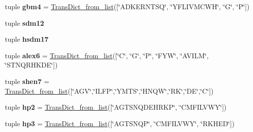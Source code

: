 \begin{DoxyCompactItemize}
\item 
\hypertarget{namespacefeat__extract_1_1_a_alphabets_a840c18714949805c6fa9387a45677e79}{}tuple {\bfseries gbm4} = \hyperlink{namespacefeat__extract_1_1_a_alphabets_acdda8523b57175e0e79064c4da723c5d}{Trans\+Dict\+\_\+from\+\_\+list}(\mbox{[}\char`\"{}A\+D\+K\+E\+R\+N\+T\+S\+Q\char`\"{}, \char`\"{}Y\+F\+L\+I\+V\+M\+C\+W\+H\char`\"{}, \char`\"{}G\char`\"{}, \char`\"{}P\char`\"{}\mbox{]})\label{namespacefeat__extract_1_1_a_alphabets_a840c18714949805c6fa9387a45677e79}

\item 
tuple {\bfseries sdm12}
\item 
tuple {\bfseries hsdm17}
\item 
\hypertarget{namespacefeat__extract_1_1_a_alphabets_a16f79a548ed9c1a0ac07242b7ee87e6f}{}tuple {\bfseries alex6} = \hyperlink{namespacefeat__extract_1_1_a_alphabets_acdda8523b57175e0e79064c4da723c5d}{Trans\+Dict\+\_\+from\+\_\+list}(\mbox{[}\char`\"{}C\char`\"{}, \char`\"{}G\char`\"{}, \char`\"{}P\char`\"{}, \char`\"{}F\+Y\+W\char`\"{}, \char`\"{}A\+V\+I\+L\+M\char`\"{}, \char`\"{}S\+T\+N\+Q\+R\+H\+K\+D\+E\char`\"{}\mbox{]})\label{namespacefeat__extract_1_1_a_alphabets_a16f79a548ed9c1a0ac07242b7ee87e6f}

\item 
\hypertarget{namespacefeat__extract_1_1_a_alphabets_a79455c270199f8958d677299fb11768c}{}tuple {\bfseries shen7} = \hyperlink{namespacefeat__extract_1_1_a_alphabets_acdda8523b57175e0e79064c4da723c5d}{Trans\+Dict\+\_\+from\+\_\+list}(\mbox{[}\char`\"{}A\+G\+V\char`\"{},\char`\"{}I\+L\+F\+P\char`\"{},\char`\"{}Y\+M\+T\+S\char`\"{},\char`\"{}H\+N\+Q\+W\char`\"{},\char`\"{}R\+K\char`\"{},\char`\"{}D\+E\char`\"{},\char`\"{}C\char`\"{}\mbox{]})\label{namespacefeat__extract_1_1_a_alphabets_a79455c270199f8958d677299fb11768c}

\item 
\hypertarget{namespacefeat__extract_1_1_a_alphabets_a95cd4de562763f26e44fa8b98519e724}{}tuple {\bfseries hp2} = \hyperlink{namespacefeat__extract_1_1_a_alphabets_acdda8523b57175e0e79064c4da723c5d}{Trans\+Dict\+\_\+from\+\_\+list}(\mbox{[}\char`\"{}A\+G\+T\+S\+N\+Q\+D\+E\+H\+R\+K\+P\char`\"{}, \char`\"{}C\+M\+F\+I\+L\+V\+W\+Y\char`\"{}\mbox{]})\label{namespacefeat__extract_1_1_a_alphabets_a95cd4de562763f26e44fa8b98519e724}

\item 
\hypertarget{namespacefeat__extract_1_1_a_alphabets_a73444dc0bac268f5add34ba20a43e7ca}{}tuple {\bfseries hp3} = \hyperlink{namespacefeat__extract_1_1_a_alphabets_acdda8523b57175e0e79064c4da723c5d}{Trans\+Dict\+\_\+from\+\_\+list}(\mbox{[}\char`\"{}A\+G\+T\+S\+N\+Q\+P\char`\"{}, \char`\"{}C\+M\+F\+I\+L\+V\+W\+Y\char`\"{}, \char`\"{}R\+K\+H\+E\+D\char`\"{}\mbox{]})\label{namespacefeat__extract_1_1_a_alphabets_a73444dc0bac268f5add34ba20a43e7ca}


\end{DoxyCompactItemize}
